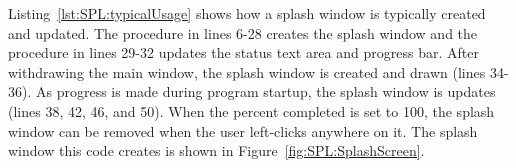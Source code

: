 Listing~\ref{lst:SPL:typicalUsage} shows how a splash window is
typically created and updated.  The procedure in lines 6-28 creates the
splash window and the procedure in lines 29-32 updates the status text
area and progress bar.  After withdrawing the main window, the splash
window is created and drawn (lines 34-36).  As progress is made during
program startup, the splash window is updates (lines 38, 42, 46, and
50). When the percent completed is set to 100, the splash window can be
removed when the user left-clicks anywhere on it.  The splash window this
code creates is shown in Figure~\ref{fig:SPL:SplashScreen}.

